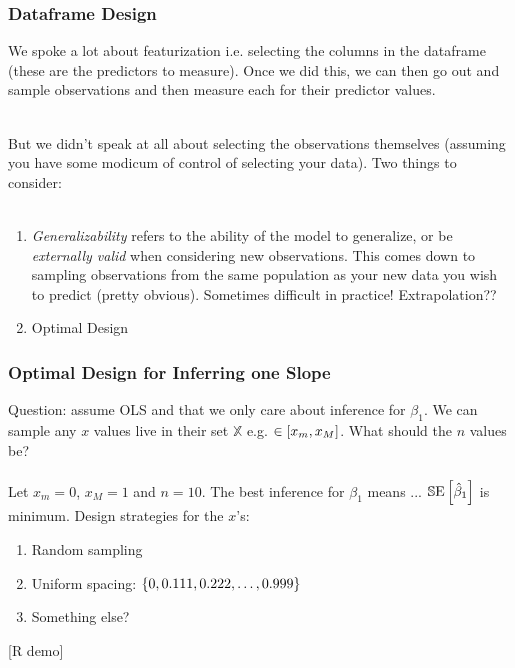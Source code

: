 \documentclass[handout]{beamer}
\begin{document}
\begin{frame}\frametitle{Dataframe Design}

We spoke a lot about featurization i.e. selecting the columns in the dataframe (these are the predictors to measure). Once we did this, we can then go out and sample observations and then measure each for their predictor values. \\~\\ \pause

But we didn't speak at all about selecting the observations themselves (assuming you have some modicum of control of selecting your data). Two things to consider: \\~\\  \pause

\begin{enumerate}
\item \emph{Generalizability} refers to the ability of the model to generalize, or be \emph{externally valid} when considering new observations. This comes down to sampling observations from the same population as your new data you wish to predict (pretty obvious). Sometimes difficult in practice! \pause Extrapolation?? \pause
\item Optimal Design
\end{enumerate}

	
\end{frame}

\begin{frame}\frametitle{Optimal Design for Inferring one Slope}

Question: assume OLS and that we only care about inference for $\beta_1$. We can sample any $x$ values live in their set $\mathbb{X}$ e.g. $\in \left[x_m, x_M\right]$. What should the $n$ values be? \\~\\

Let $x_m = 0$, $x_M = 1$ and $n = 10$. The best inference for $\beta_1$ means ... \pause $\mathbb{S}\text{E}\left[\hat{\beta}_1\right]$ is minimum. Design strategies for the $x$'s: \pause

\begin{enumerate}
\item Random sampling \pause
\item Uniform spacing: $\left\{0, 0.111, 0.222, \ldots, 0.999\right\}$ \pause
\item Something else?
\end{enumerate}

[R demo]

\end{frame}
\end{document}
